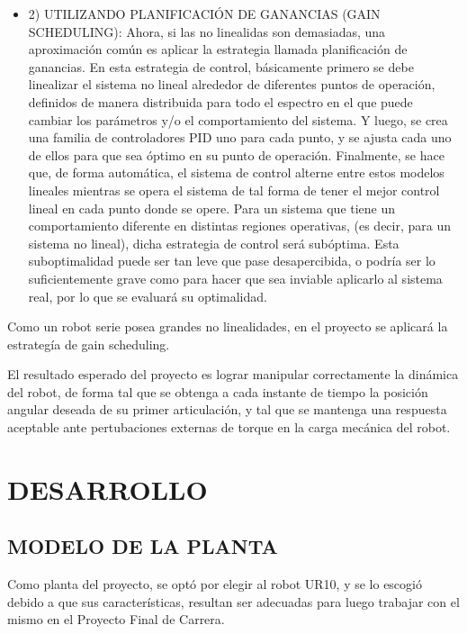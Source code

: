 \documentclass{article}
\begin{document}
\begin{sloppypar}
\begin{itemize}
    \item 2) UTILIZANDO PLANIFICACIÓN DE GANANCIAS (GAIN SCHEDULING): Ahora, si las no linealidas son demasiadas, una aproximación común es aplicar la estrategia llamada planificación de ganancias. En esta estrategia de control, básicamente primero se debe linealizar el sistema no lineal alrededor de diferentes puntos de operación, definidos de manera distribuida para todo el espectro en el que puede cambiar los parámetros y/o el comportamiento del sistema. Y luego, se crea una familia de controladores PID uno para cada punto, y se ajusta cada uno de ellos para que sea óptimo en su punto de operación. Finalmente, se hace que, de forma automática, el sistema de control alterne entre estos modelos lineales mientras se opera el sistema de tal forma de tener el mejor control lineal en cada punto donde se opere.
    Para un sistema que tiene un comportamiento diferente en distintas regiones operativas, (es decir, para un sistema no lineal), dicha estrategia de control será subóptima. Esta suboptimalidad puede ser tan leve que pase desapercibida, o podría ser lo suficientemente grave como para hacer que sea inviable aplicarlo al sistema real, por lo que se evaluará su optimalidad.
\end{itemize}

Como un robot serie posea grandes no linealidades, en el proyecto se aplicará la estrategía de gain scheduling.

El resultado esperado del proyecto es lograr manipular correctamente la dinámica del robot, de forma tal que se obtenga a cada instante de tiempo la posición angular deseada de su primer articulación, y tal que se mantenga una respuesta aceptable ante pertubaciones externas de torque en la carga mecánica del robot.



\section{DESARROLLO}
\label{sec:DESARROLLO}

\subsection{MODELO DE LA PLANTA}
\label{sec:MODELO DE LA PLANTA}

Como planta del proyecto, se optó por elegir al robot UR10, y se lo escogió debido a que sus características, resultan ser adecuadas para luego trabajar con el mismo en el Proyecto Final de Carrera.


\end{sloppypar}
\end{document}
